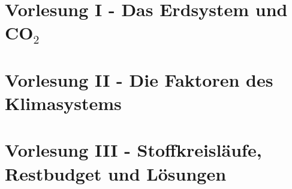 	\section{Vorlesung I - Das Erdsystem und CO$_2$}
	
	
	
	
	\section{Vorlesung II - Die Faktoren des Klimasystems}
	
	\section{Vorlesung III - Stoffkreisläufe, Restbudget und Lösungen}
	
	
	
	



